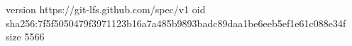 version https://git-lfs.github.com/spec/v1
oid sha256:7f5f5050479f3971123b16a7a485b9893badc89daa1be6eeb5ef1e61c088e34f
size 5566
